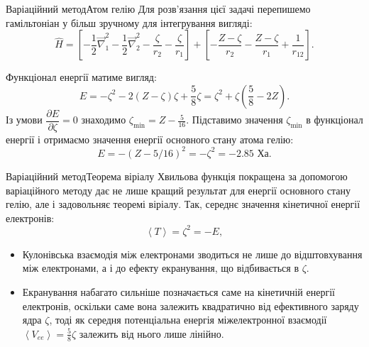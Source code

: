 \documentclass[10pt]{beamer}
\begin{document}
\begin{frame}{Варіаційний метод}{Атом гелію}
	Для розв'язання цієї задачі перепишемо гамільтоніан  у більш зручному для інтегрування вигляді:
	\begin{equation*}\label{}
		\hat{H} = \left[ -\frac12 \vec{\nabla}^2_1  -\frac12 \vec{\nabla}^2_2 - \frac{\zeta}{r_2} - \frac{\zeta}{r_1} \right] + \left[- \frac{Z-\zeta}{r_2} - \frac{Z-\zeta}{r_1} + \frac{1}{r_{12}} \right].
	\end{equation*}

	Функціонал енергії матиме вигляд:
	\begin{equation*}
		E = -\zeta^2 - 2(Z - \zeta)\zeta + \frac58 \zeta = \zeta^2 + \zeta\left( \frac58 - 2Z\right) .
	\end{equation*}
	Із умови $\dfrac{\partial E}{\partial \zeta} = 0$ знаходимо $	\zeta_{\min} = Z - \frac{5}{16}$.
	Підставимо значення $\zeta_{\min}$ в функціонал енергії  і отримаємо значення енергії основного стану атома гелію:
	\begin{equation*}\label{}
		E = -\left( Z - 5/16\right)^2 = -\zeta^2 = -2.85 \text{~Ха}.
	\end{equation*}
\end{frame}





\begin{frame}{Варіаційний метод}{Теорема віріалу}\small
	Хвильова функція покращена за допомогою варіаційного методу дає не лише кращий результат для енергії основного стану гелію, але і задовольняє теоремі віріалу. Так, середнє значення кінетичної енергії електронів:
	\[
		\left\langle T \right\rangle = \zeta^2 = - E,
	\]
	\begin{itemize}
		\item  Кулонівська взаємодія між електронами зводиться не лише до відштовхування між електронами, а і до ефекту екранування, що відбивається в $\zeta$.
		\item Екранування набагато сильніше позначається саме на кінетичній енергії електронів, оскільки саме вона залежить квадратично від ефективного заряду ядра $\zeta$, тоді як середня потенціальна енергія міжелектронної взаємодії  $\left\langle V_{ee} \right\rangle = \frac58 \zeta$ залежить від нього лише лінійно.
	\end{itemize}
\end{frame}
\end{document}
